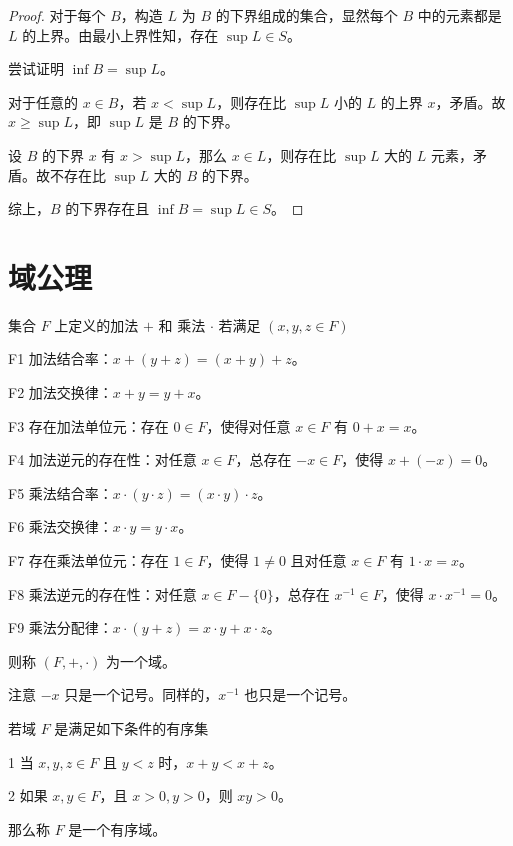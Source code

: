 \begin{proof}
	对于每个 $B$，构造 $L$ 为 $B$ 的下界组成的集合，显然每个 $B$ 中的元素都是 $L$ 的上界。由最小上界性知，存在 $\sup L \in S$。

	尝试证明 $\inf B=\sup L$。
	
	对于任意的 $x\in B$，若 $x<\sup L$，则存在比 $\sup L$ 小的 $L$ 的上界 $x$，矛盾。故 $x \geqslant \sup L$，即 $\sup L$ 是 $B$ 的下界。

	设 $B$ 的下界 $x$ 有 $x>\sup L$，那么 $x\in L$，则存在比 $\sup L$ 大的 $L$ 元素，矛盾。故不存在比 $\sup L$ 大的 $B$ 的下界。

	综上，$B$ 的下界存在且 $\inf B=\sup L \in S$。
\end{proof}

\section{域公理}

集合 $F$ 上定义的加法 $+$ 和 乘法 $\cdot$ 若满足 $(x,y,z\in F)$

F1 加法结合率：$x+(y+z) = (x+y)+z$。

F2 加法交换律：$x+y = y+x$。

F3 存在加法单位元：存在 $0\in F$，使得对任意 $x\in F$ 有 $0+x=x$。

F4 加法逆元的存在性：对任意 $x\in F$，总存在 $-x\in F$，使得 $x+(-x)=0$。

F5 乘法结合率：$x\cdot (y\cdot z) = (x\cdot y)\cdot z$。

F6 乘法交换律：$x\cdot y = y\cdot x$。

F7 存在乘法单位元：存在 $1\in F$，使得 $1\ne 0$ 且对任意 $x\in F$ 有 $1\cdot x=x$。

F8 乘法逆元的存在性：对任意 $x\in F-\{0\}$，总存在 $x^{-1}\in F$，使得 $x\cdot x^{-1} =0$。

F9 乘法分配律：$x \cdot (y+z) = x\cdot y + x\cdot z$。

则称 $(F,+,\cdot)$ 为一个域。

注意 $-x$ 只是一个记号。同样的，$x^{-1}$ 也只是一个记号。

\begin{definition}[有序域]
	若域 $F$ 是满足如下条件的有序集

	\num{1} 当 $x,y,z\in F$ 且 $y<z$ 时，$x+y<x+z$。

	\num{2} 如果 $x,y\in F$，且 $x>0,y>0$，则 $xy>0$。

	那么称 $F$ 是一个有序域。
\end{definition}

